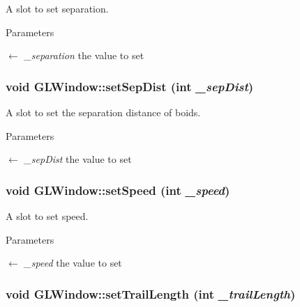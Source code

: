 A slot to set separation. 
\begin{DoxyParams}{Parameters}
\item[\mbox{$\leftarrow$} {\em \_\-separation}]the value to set \end{DoxyParams}
\hypertarget{classGLWindow_a27a12ceab95f009008fb994c7d38309d}{
\subsubsection[{setSepDist}]{\setlength{\rightskip}{0pt plus 5cm}void GLWindow::setSepDist (int {\em \_\-sepDist})}}
\label{classGLWindow_a27a12ceab95f009008fb994c7d38309d}


A slot to set the separation distance of boids. 
\begin{DoxyParams}{Parameters}
\item[\mbox{$\leftarrow$} {\em \_\-sepDist}]the value to set \end{DoxyParams}
\hypertarget{classGLWindow_a151fe727550b818c321dfe1f6cbde599}{
\subsubsection[{setSpeed}]{\setlength{\rightskip}{0pt plus 5cm}void GLWindow::setSpeed (int {\em \_\-speed})}}
\label{classGLWindow_a151fe727550b818c321dfe1f6cbde599}


A slot to set speed. 
\begin{DoxyParams}{Parameters}
\item[\mbox{$\leftarrow$} {\em \_\-speed}]the value to set \end{DoxyParams}
\hypertarget{classGLWindow_a646290808ab2b7f93e2c4f28b75ed96e}{
\subsubsection[{setTrailLength}]{\setlength{\rightskip}{0pt plus 5cm}void GLWindow::setTrailLength (int {\em \_\-trailLength})}}
\label{classGLWindow_a646290808ab2b7f93e2c4f28b75ed96e}



